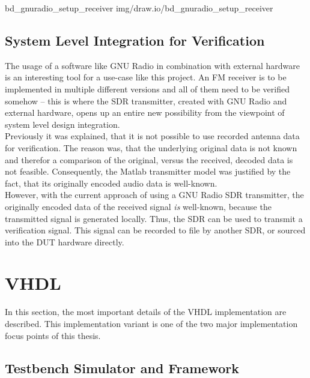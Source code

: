  {bd_gnuradio_setup_receiver} {img/draw.io/bd_gnuradio_setup_receiver}

\subsection{System Level Integration for Verification}

The usage of a software like GNU Radio in combination with external hardware is an interesting tool for a use-case like this project.
An FM receiver is to be implemented in multiple different versions and all of them need to be verified somehow -- this is where the SDR transmitter, created with GNU Radio and external hardware, opens up an entire new possibility from the viewpoint of system level design integration.\\

Previously it was explained, that it is not possible to use recorded antenna data for verification.
The reason was, that the underlying original data is not known and therefor a comparison of the original, versus the received, decoded data is not feasible.
Consequently, the Matlab transmitter model was justified by the fact, that its originally encoded audio data is well-known.\\

However, with the current approach of using a GNU Radio SDR transmitter, the originally encoded data of the received signal \textit{is} well-known, because the transmitted signal is generated locally.
Thus, the SDR can be used to transmit a verification signal.
This signal can be recorded to file by another SDR, or sourced into the DUT hardware directly.

\section{VHDL}

In this section, the most important details of the VHDL implementation are described.
This implementation variant is one of the two major implementation focus points of this thesis.

\subsection{Testbench Simulator and Framework}


